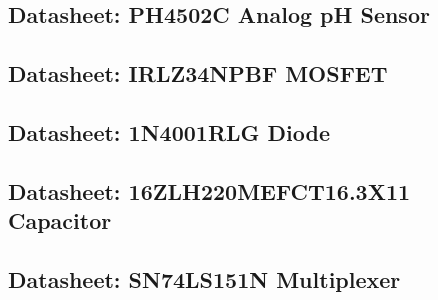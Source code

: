 \documentclass[12pt]{article} %
\begin{document}
\subsection{Datasheet: PH4502C Analog pH Sensor}

\pagebreak
\subsection{Datasheet: IRLZ34NPBF MOSFET}
\label{appendix:mosfet}

\pagebreak
\subsection{Datasheet: 1N4001RLG Diode}

\pagebreak
\subsection{Datasheet: 16ZLH220MEFCT16.3X11 Capacitor}

\pagebreak
\subsection{Datasheet: SN74LS151N Multiplexer}

\pagebreak
\end{document}
